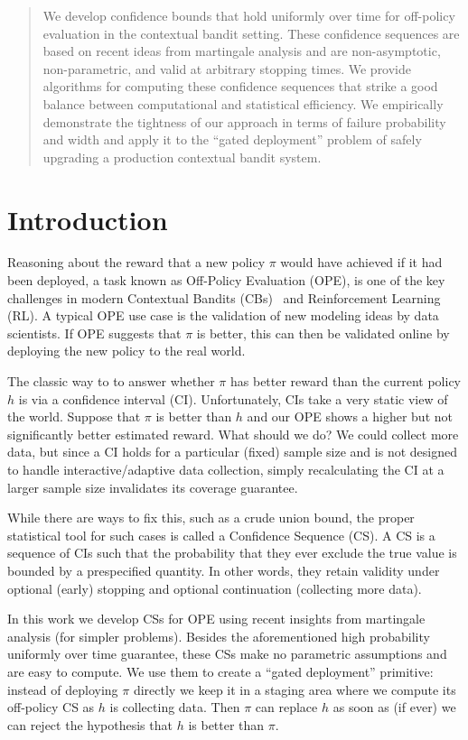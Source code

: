 \begin{abstract}
	We develop confidence bounds that hold uniformly over time for off-policy
	evaluation in the contextual bandit setting. These confidence sequences
	are based on recent ideas from martingale analysis and are
	non-asymptotic, non-parametric, and valid at arbitrary stopping times.
	We provide algorithms for computing these confidence sequences that
	strike a good balance between computational and statistical efficiency.
	We empirically demonstrate the tightness of our approach in terms of
	failure probability and width and apply it to the ``gated deployment'' problem of safely upgrading a production contextual bandit system.
\end{abstract}

\section{Introduction} 
Reasoning about the reward that a new policy $\pi$ would have achieved if it
had been deployed, a task known as Off-Policy Evaluation (OPE), is one of the
key challenges in modern Contextual Bandits (CBs)~\cite{epochgreedy} and Reinforcement Learning (RL).  A typical OPE use case is the validation of new modeling ideas
by data scientists. If OPE suggests that $\pi$ is better, this can then be
validated online by deploying the new policy to the real world.

The classic way to to answer whether $\pi$ has better reward than the current
policy $h$ is via a confidence interval (CI).  Unfortunately, CIs take a very
static view of the world.  Suppose that $\pi$ is better than $h$ and our OPE
shows a higher but not significantly better estimated reward. What should we
do? We could collect more data, but since a CI holds for a particular (fixed) sample size and is not designed to handle interactive/adaptive data collection, simply recalculating the CI at a larger sample size invalidates its coverage
guarantee. 

While there are ways to fix this, such as a crude union bound, the proper statistical tool for such cases is called a Confidence Sequence (CS). A CS is a
sequence of CIs such that the probability that they ever exclude the true value
is bounded by a prespecified quantity.  In other words, they retain validity under optional (early)
stopping and optional continuation (collecting more data).

In this work we develop CSs for OPE using recent insights from martingale
analysis (for simpler problems).  Besides the aforementioned high probability uniformly over time
guarantee, these CSs make no parametric assumptions and are easy to compute.
We use them to create a ``gated deployment'' primitive: instead of deploying
$\pi$ directly we keep it in a staging area where we compute its off-policy CS
as $h$ is collecting data.  Then $\pi$ can replace $h$ as soon as (if ever) we
can reject the hypothesis that $h$ is better than $\pi$.

